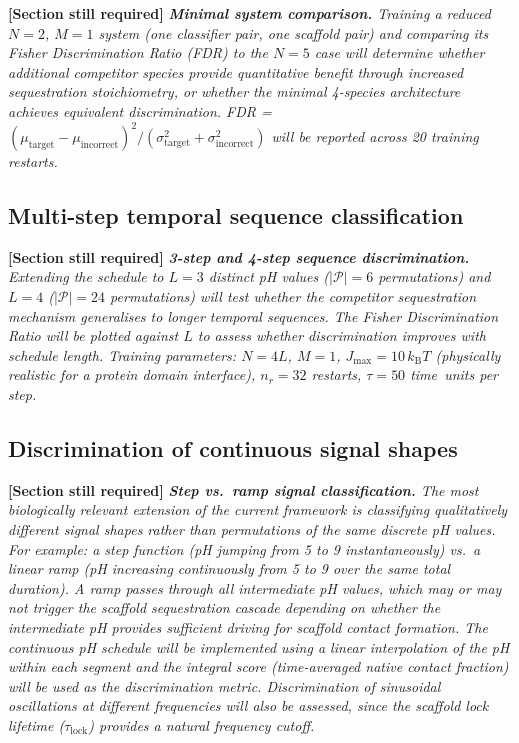 \documentclass[10pt,twocolumn]{article}
\newcommand{\gap}[1]{%
  \begin{gapenv}
    \noindent\textcolor{gapred}{\textbf{[Section still required]}}\;
    \textcolor{gapred}{\textit{#1}}
  \end{gapenv}%
}
\begin{document}
\gap{%
  \textbf{Minimal system comparison.}
  Training a reduced $N=2$, $M=1$ system (one classifier pair, one
  scaffold pair) and comparing its Fisher Discrimination Ratio (FDR) to
  the $N=5$ case will determine whether additional competitor species
  provide quantitative benefit through increased sequestration
  stoichiometry, or whether the minimal 4-species architecture achieves
  equivalent discrimination.
  FDR = $(\mu_\mathrm{target}-\mu_\mathrm{incorrect})^2/
  (\sigma^2_\mathrm{target}+\sigma^2_\mathrm{incorrect})$
  will be reported across 20 training restarts.
}

\subsection{Multi-step temporal sequence classification}

\gap{%
  \textbf{3-step and 4-step sequence discrimination.}
  Extending the schedule to $L=3$ distinct pH values ($|\mathcal{P}| = 6$
  permutations) and $L=4$ ($|\mathcal{P}| = 24$ permutations) will test
  whether the competitor sequestration mechanism generalises to longer
  temporal sequences.
  The Fisher Discrimination Ratio will be plotted against $L$ to assess
  whether discrimination improves with schedule length.
  Training parameters: $N = 4L$, $M=1$, $J_\mathrm{max}=10\,k_\mathrm{B}T$
  (physically realistic for a protein domain interface), $n_r = 32$
  restarts, $\tau = 50$ time~units per step.
}

\subsection{Discrimination of continuous signal shapes}

\gap{%
  \textbf{Step vs.\ ramp signal classification.}
  The most biologically relevant extension of the current framework is
  classifying qualitatively different signal \emph{shapes} rather than
  permutations of the same discrete pH values.
  For example: a step function (pH jumping from 5 to 9 instantaneously)
  vs.\ a linear ramp (pH increasing continuously from 5 to 9 over the
  same total duration).
  A ramp passes through all intermediate pH values, which may or may not
  trigger the scaffold sequestration cascade depending on whether the
  intermediate pH provides sufficient driving for scaffold contact formation.
  The continuous pH schedule will be implemented using a linear interpolation
  of the pH within each segment and the integral score (time-averaged
  native contact fraction) will be used as the discrimination metric.
  Discrimination of sinusoidal oscillations at different frequencies will
  also be assessed, since the scaffold lock lifetime ($\tau_\mathrm{lock}$)
  provides a natural frequency cutoff.
}
\end{document}
